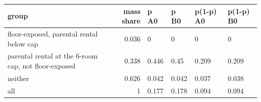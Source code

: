 \begingroup\small
\setlength{\tabcolsep}{3pt}
\renewcommand{\arraystretch}{1.04}
\begin{tabularx}{\linewidth}{XrXXXX}
\toprule
group & mass share & p A0 & p B0 & p(1-p) A0 & p(1-p) B0 \\
\midrule
floor-exposed, parental rental below cap & 0.036 & 0 & 0 & 0 & 0 \\
parental rental at the 6-room cap, not floor-exposed & 0.338 & 0.446 & 0.45 & 0.209 & 0.209 \\
neither & 0.626 & 0.042 & 0.042 & 0.037 & 0.038 \\
all & 1 & 0.177 & 0.178 & 0.094 & 0.094 \\
\bottomrule
\end{tabularx}
\endgroup
